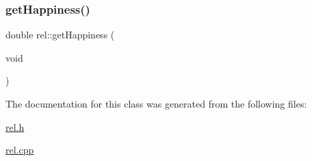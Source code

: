 \subsubsection{\texorpdfstring{get\+Happiness()}{getHappiness()}}
{\footnotesize\ttfamily double rel\+::get\+Happiness (\begin{DoxyParamCaption}\item[{void}]{ }\end{DoxyParamCaption})}



The documentation for this class was generated from the following files\+:\begin{DoxyCompactItemize}
\item 
\hyperlink{rel_8h}{rel.\+h}\item 
\hyperlink{rel_8cpp}{rel.\+cpp}\end{DoxyCompactItemize}
